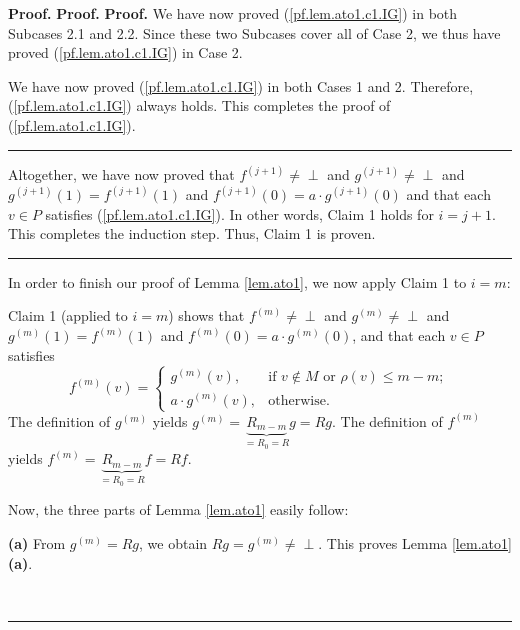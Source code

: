 \documentclass[numbers=enddot,12pt,final,onecolumn,notitlepage]{scrartcl}%
\theoremstyle{definition}
\newenvironment{verlong}{}{}
\newcommand{\undf}{\operatorname*{\bot}}
\newenvironment{proof}[1][Proof]{\noindent\textbf{#1.} }{\ \rule{0.5em}{0.5em}}
\begin{document}
\begin{verlong}
\begin{proof}
\begin{proof}
\begin{proof}
We have now proved (\ref{pf.lem.ato1.c1.IG}) in both Subcases 2.1 and 2.2.
Since these two Subcases cover all of Case 2, we thus have proved
(\ref{pf.lem.ato1.c1.IG}) in Case 2.

We have now proved (\ref{pf.lem.ato1.c1.IG}) in both Cases 1 and 2. Therefore,
(\ref{pf.lem.ato1.c1.IG}) always holds. This completes the proof of
(\ref{pf.lem.ato1.c1.IG}).
\end{proof}

Altogether, we have now proved that $f^{\left(  j+1\right)  }\neq\undf$ and
$g^{\left(  j+1\right)  }\neq\undf$ and $g^{\left(  j+1\right)  }\left(
1\right)  =f^{\left(  j+1\right)  }\left(  1\right)  $ and $f^{\left(
j+1\right)  }\left(  0\right)  =a\cdot g^{\left(  j+1\right)  }\left(
0\right)  $ and that each $v\in P$ satisfies (\ref{pf.lem.ato1.c1.IG}). In
other words, Claim 1 holds for $i=j+1$. This completes the induction step.
Thus, Claim 1 is proven.
\end{proof}

In order to finish our proof of Lemma \ref{lem.ato1}, we now apply Claim 1 to
$i=m$:

Claim 1 (applied to $i=m$) shows that $f^{\left(  m\right)  }\neq\undf$ and
$g^{\left(  m\right)  }\neq\undf$ and $g^{\left(  m\right)  }\left(  1\right)
=f^{\left(  m\right)  }\left(  1\right)  $ and $f^{\left(  m\right)  }\left(
0\right)  =a\cdot g^{\left(  m\right)  }\left(  0\right)  $, and that each
$v\in P$ satisfies%
\begin{equation}
f^{\left(  m\right)  }\left(  v\right)  =%
\begin{cases}
g^{\left(  m\right)  }\left(  v\right)  , & \text{if }v\notin M\text{ or }%
\rho\left(  v\right)  \leq m-m;\\
a\cdot g^{\left(  m\right)  }\left(  v\right)  , & \text{otherwise.}%
\end{cases}
\label{pf.lem.ato1.fmv=}%
\end{equation}
The definition of $g^{\left(  m\right)  }$ yields $g^{\left(  m\right)
}=\underbrace{R_{m-m}}_{=R_{0}=R}g=Rg$. The definition of $f^{\left(
m\right)  }$ yields $f^{\left(  m\right)  }=\underbrace{R_{m-m}}_{=R_{0}%
=R}f=Rf$.

Now, the three parts of Lemma \ref{lem.ato1} easily follow: \medskip

\textbf{(a)} From $g^{\left(  m\right)  }=Rg$, we obtain $Rg=g^{\left(
m\right)  }\neq\undf$. This proves Lemma \ref{lem.ato1} \textbf{(a)}. \medskip


\end{proof}
\end{verlong}
\end{document}
